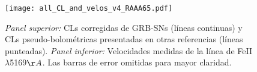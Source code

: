 \documentclass[baaa]{baaa}
\begin{document}


\begin{figure}[h!]
    \centering
    \texttt{[image: all\_CL\_and\_velos\_v4\_RAAA65.pdf]}\vspace{-1cm}
    \caption{\textit{Panel superior:} CLs corregidas de GRB-SNs (l\'ineas continuas) y CLs pseudo-bolom\'etricas presentadas en otras referencias (l\'ineas punteadas). \textit{Panel inferior:} Velocidades medidas de la l\'inea de FeII $\lambda$5169${\AA}$. Las barras de error omitidas para mayor claridad. }
    \label{fig:all}
\end{figure}

\end{document}
